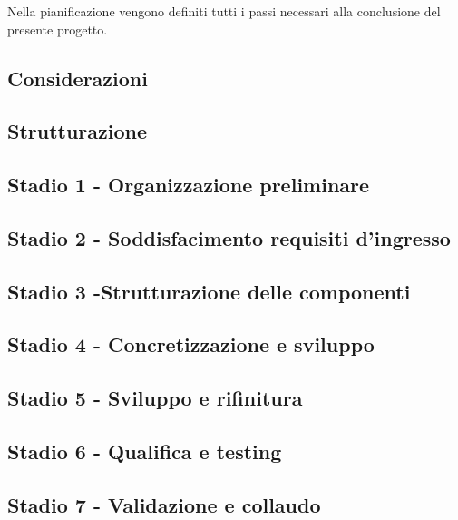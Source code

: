Nella pianificazione vengono definiti tutti i passi necessari alla conclusione del presente progetto.

\subsection{Considerazioni}\label{sec:Considerazioni}


\subsection{Strutturazione}\label{sec:Strutturazione}


\subsection{Stadio 1 - Organizzazione preliminare}\label{sec:Stadio1}


\subsection{Stadio 2 - Soddisfacimento requisiti d'ingresso}\label{sec:Stadio2}

    
\subsection{Stadio 3 -Strutturazione delle componenti}\label{sec:Stadio3}

    
\subsection{Stadio 4 - Concretizzazione e sviluppo}\label{sec:Stadio4}

    
\subsection{Stadio 5 - Sviluppo e rifinitura }\label{sec:Stadio5}

    
\subsection{Stadio 6 - Qualifica e testing}\label{sec:Stadio6}

    
\subsection{Stadio 7 - Validazione e collaudo}\label{sec:Stadio7}
